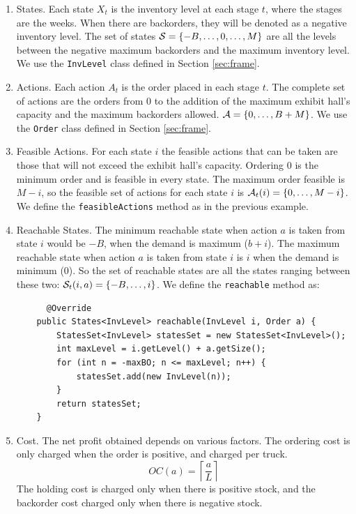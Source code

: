\documentclass[11pt]{article}
\newcommand {\cA}{\ensuremath \mathcal{A}}
\newcommand {\cS}{\ensuremath \mathcal{S}}
\begin{document}
\begin{enumerate}
  \item States. Each state $X_t$ is the inventory level at each stage $t$, where the stages are the weeks. When there are backorders, they will be denoted as a negative inventory level. The set of states $\cS = \{-B, \ldots, 0, \ldots, M  \}$ are all the levels between the negative maximum backorders and the maximum inventory level. We use the \lstinline!InvLevel! class defined in Section \ref{sec:frame}.
  \item Actions. Each action $A_t$ is the order placed in each stage $t$. The complete set of actions are the orders from 0 to the addition of the maximum exhibit hall's capacity and the maximum backorders allowed. $\cA = \{0,\ldots,B+M\}$. We use the \lstinline!Order! class defined in Section \ref{sec:frame}.
  \item Feasible Actions. For each state $i$ the feasible actions that can be taken are those that will not exceed the exhibit hall's capacity. Ordering 0 is the minimum order and is feasible in every state. The maximum order feasible is $M-i$, so the feasible set of actions for each state $i$ is $\cA_t(i) =\{0,\ldots,M-i\}$. We define the \lstinline!feasibleActions! method as in the previous example.
  \item Reachable States. The minimum reachable state when action $a$ is taken from state $i$ would be $-B$, when the demand is maximum ($b+i$). The maximum reachable state when action $a$ is taken from state $i$ is $i$ when the demand is minimum (0). So the set of reachable states are all the states ranging between these two: $\cS_t(i,a) = \{-B, \ldots, i\}$. We define the \lstinline!reachable! method as:
\begin{lstlisting}
      @Override
    public States<InvLevel> reachable(InvLevel i, Order a) {
        StatesSet<InvLevel> statesSet = new StatesSet<InvLevel>();
        int maxLevel = i.getLevel() + a.getSize();
        for (int n = -maxBO; n <= maxLevel; n++) {
            statesSet.add(new InvLevel(n));
        }
        return statesSet;
    }
\end{lstlisting}
  \item Cost. The net profit obtained depends on various factors. The ordering cost is only charged when the order is positive, and charged per truck.
  \begin{equation*}
    OC(a)=  \left\lceil \frac{a}{L}\right\rceil
  \end{equation*}
  The holding cost is charged only when there is positive stock, and the backorder cost charged only when there is negative stock.

\end{enumerate}
\end{document}
